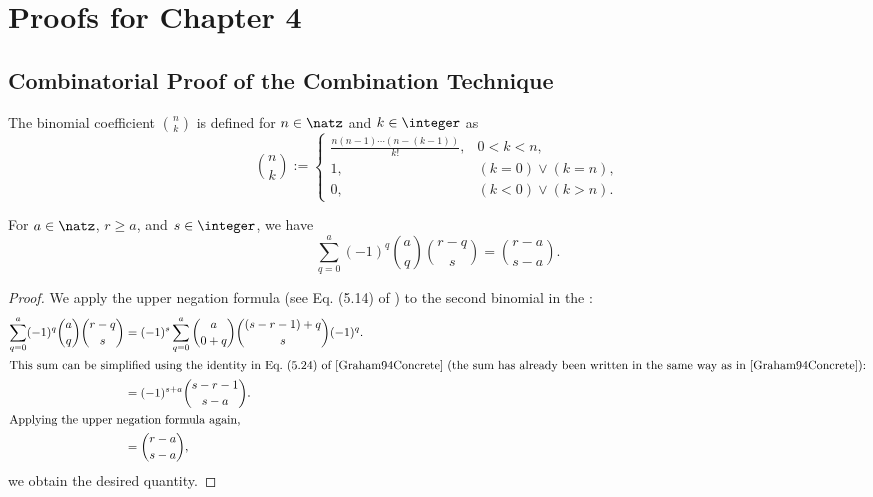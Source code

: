 \section{Proofs for Chapter 4}
\label{sec:a13chapter4}

\printornamentsfalse
\subsection{Combinatorial Proof of the Combination Technique}
\label{sec:a131proofCombiTechnique}
\printornamentstrue


\begin{definition}
  \label{def:binomialCoefficient}
  The binomial coefficient $\binom{n}{k}$ is defined for
  $n \in \natz$ and $k \in \integer$ as
  \begin{equation}
    \binom{n}{k}
    :=
    \begin{cases}
      \frac{n (n - 1) \dotsm (n - (k-1))}{k!},&0 < k < n,\\
      1,&(k = 0) \lor (k = n),\\
      0,&(k < 0) \lor (k > n).
    \end{cases}
  \end{equation}
\end{definition}

\begin{lemma}
  \label{lemma:inclusionExclusionCountingLemma}
  For $a \in \natz$, $r \ge a$, and $s \in \integer$, we have
  \begin{equation}
    \sum_{q=0}^a (-1)^q \binom{a}{q} \binom{r-q}{s}
    = \binom{r-a}{s-a}.
  \end{equation}
\end{lemma}

\begin{proof}
  We apply the upper negation formula
  (see Eq. (5.14) of \cite{Graham94Concrete})
  to the second binomial in the \lhs:
  \begin{subequations}
    \begin{align}
      \sum_{q=0}^a (-1)^q \binom{a}{q} \binom{r-q}{s}
      &= (-1)^s \sum_{q=0}^a \binom{a}{0+q} \binom{(s-r-1)+q}{s} (-1)^q.\\
      \intertext{%
        This sum can be simplified using the identity
        in Eq.\ (5.24) of \cite{Graham94Concrete}
        (the sum has already been written in the same way as in
        \cite{Graham94Concrete}):%
      }
      &= (-1)^{s+a} \binom{s-r-1}{s-a}.\\
      \intertext{%
        Applying the upper negation formula again,%
      }
      &= \binom{r-a}{s-a},
    \end{align}
  \end{subequations}
  we obtain the desired quantity.
\end{proof}

